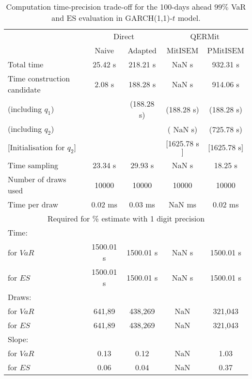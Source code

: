 { \renewcommand{\arraystretch}{1.3} 
\begin{table}[h] 
\centering 
\caption{Computation time-precision trade-off for the 100-days ahead  $99\%$ VaR and ES evaluation in GARCH(1,1)-$t$ model.} 
\label{tab:time_precision_t_garch2_noS} 
\begin{tabular}{lcccc}  
  & \multicolumn{2}{c}{Direct} & \multicolumn{2}{c}{QERMit}  \\ \cline{2-5} 
  & Naive & Adapted & MitISEM & PMitISEM  \\ \hline 
Total time & 25.42 s & 218.21 s &  NaN s & 932.31 s \\ 
Time construction candidate & 2.08 s & 188.28 s &  NaN s & 914.06 s \\ 
 (including $q_{1}$) &   &  (188.28 s) & (188.28 s) & (188.28 s) \\ 
 (including $q_{2}$) &   &  & ( NaN s) & (725.78 s) \\ 
$[$Initialisation for $q_{2}$$]$&   &   & $[$1625.78 s$]$ & $[$1625.78 s$]$ \\ 
Time sampling & 23.34 s & 29.93 s &  NaN s & 18.25 s  \\  
Number of draws used & 10000 & 10000 & 10000 & 10000 \\ 
Time per draw & 0.02 ms & 0.03 ms &  NaN ms & 0.02 ms \\ \hline 
\multicolumn{5}{c}{Required for \% estimate with 1 digit precision} \\ \hline 
Time: &  &  &   &  \\ 
\hspace{1cm} for $VaR$ & 1500.01 s & 1500.01 s &  NaN s & 1500.01 s \\ 
\hspace{1cm} for $ES$ & 1500.01 s & 1500.01 s &  NaN s & 1500.01 s \\ 
Draws: &  &  &   &  \\ 
\hspace{1cm} for $VaR$ & 641,89 & 438,269  & NaN  & 321,043  \\ 
\hspace{1cm} for $ES$ & 641,89 & 438,269  & NaN   & 321,043  \\ 
\hline 
Slope: &  &  &   &  \\ 
\hspace{1cm} for $VaR$ & 0.13 & 0.12  &  NaN  & 1.03  \\ 
\hspace{1cm} for $ES$ & 0.06 & 0.04  &  NaN   & 0.37  \\  \hline 
\end{tabular} 
\end{table} 
} 
